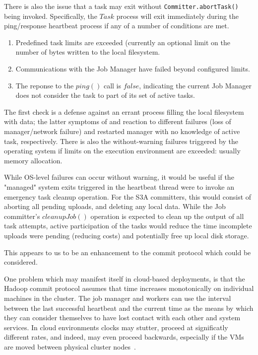 \documentclass[9pt,technote]{IEEEtran}
\begin{document}
There is also the issue that a task may exit without \texttt{Committer.abortTask()}
being invoked.
Specifically, the $Task$ process will exit immediately during the ping/response
heartbeat process if any of a number of conditions are met.
\begin{enumerate}
  \item Predefined task limits are exceeded
  (currently an optional limit on the number of bytes written to the local filesystem.
  \item Communications with the Job Manager have failed beyond configured limits.
  \item The reponse to the $ping()$ call is $false$, indicating the current
  Job Manager does not consider the task to part of its set of active tasks.
\end{enumerate}

The first check is a defense against an errant process filling the local
filesystem with data;
the latter symptoms of and reaction to different failures (loss of manager/network failure)
and restarted manager with no knowledge of active task, respectively.
There is also the without-warning failures triggered by the operating system
if limits on the execution environment are exceeded: usually memory allocation.

While OS-level failures can occur without warning, it would be useful if the
"managed" system exits triggered in the heartbeat thread were to invoke
an emergency task cleanup operation.
For the S3A committers, this would consist of aborting all pending uploads, and
deleting any local data.
While the Job committer's $cleanupJob()$ operation is expected to clean up
the output of all task attempts, active participation of the tasks would
reduce the time incomplete uploads were pending (reducing costs) and
potentially free up local disk storage.

This appears to us to be an enhancement to the commit protocol which could
be considered.


One problem which may manifest itself in cloud-based deployments,
is that the Hadoop commit protocol assumes that time increases monotonically
on individual machines in the cluster.
The job manager and workers can use the interval between the last successful heartbeat
and the current time as the means by which they can consider themselves to have lost
contact with each other and system services.
In cloud environments clocks may stutter, proceed at significatly different rates,
and indeed, may even proceed backwards, especially if the VMs are moved between
physical cluster nodes\ \cite{anything?}.
\end{document}
